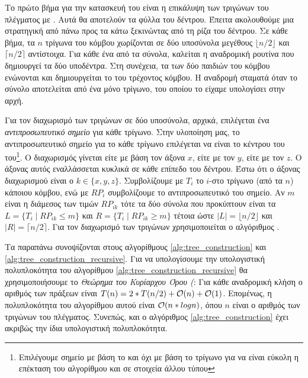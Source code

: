Το πρώτο βήμα για την κατασκευή του  είναι η επικάλυψη 
των τριγώνων του πλέγματος με .
Αυτά θα αποτελούν τα φύλλα του δέντρου.
Έπειτα ακολουθούμε μια στρατηγική από πάνω προς τα κάτω ξεκινώντας 
από τη ρίζα του δέντρου. 
Σε κάθε βήμα, τα $n$ τρίγωνα του κόμβου χωρίζονται σε δύο υποσύνολα 
μεγέθους $\lfloor n/2\rfloor$ και $\lceil n/2 \rceil$ αντίστοιχα.
Για κάθε ένα από τα σύνολα, καλείται η αναδρομική ρουτίνα που δημιουργεί 
τα δύο υποδέντρα.  
Στη συνέχεια, τα  των δύο παιδιών του κόμβου ενώνονται 
και δημιουργείται το  του τρέχοντος κόμβου.
Η αναδρομή σταματά όταν το σύνολο αποτελείται από ένα μόνο τρίγωνο, 
του οποίου το  είχαμε υπολογίσει στην αρχή.

Για τον διαχωρισμό των τριγώνων σε δύο υποσύνολα, αρχικά, επιλέγεται 
ένα \textit{αντιπροσωπευτικό σημείο} για κάθε τρίγωνο.
Στην υλοποίηση μας, το αντιπροσωπευτικό σημείο για το κάθε τρίγωνο 
επιλέγεται να είναι το κέντρου του  του\footnote{Επιλέγουμε 
σημείο με βάση το  και όχι με βάση το τρίγωνο για να είναι 
εύκολη η επέκταση του αλγορίθμου και σε στοιχεία άλλου τύπου}.
Ο διαχωρισμός γίνεται είτε με βάση τον άξονα $x$, είτε με τον $y$, είτε 
με τον $z$.
Ο άξονας αυτός εναλλάσσεται κυκλικά σε κάθε επίπεδο του δέντρου.
Έστω ότι ο άξονας διαχωρισμού είναι ο $k \in \{x,y,z\}$. 
Συμβολίζουμε με $T_i$ το $i$-στο τρίγωνο (από τα $n$)
κάποιου κόμβου, ενώ με $RP_i$ συμβολίζουμε το αντιπροσωπευτικό του 
σημείο.
Αν $m$ είναι η διάμεσος των τιμών $RP_{ik}$ τότε τα δύο σύνολα 
που προκύπτουν είναι τα $L = \{T_i \mid RP_{ik} \leq m \}$ και 
$R = \{T_i  \mid  RP_{ik} \geq m \}$ 
τέτοια ώστε 
$|L| = \lfloor n/2 \rfloor$ και $|R| = \lceil n/2 \rceil$.
Για τον διαχωρισμό των τριγώνων χρησιμοποιείται ο 
αλγόριθμος \texttt{} \cite{hoare1961algorithm}.

Τα παραπάνω συνοψίζονται στους αλγορίθμους \ref{alg:tree_construction} και 
\ref{alg:tree_construction_recursive}.
Για να υπολογίσουμε την υπολογιστική πολυπλοκότητα του αλγορίθμου 
\ref{alg:tree_construction_recursive} θα χρησιμοποιήσουμε το 
\textit{Θεώρημα του Κυρίαρχου Όρου (}:
Για κάθε αναδρομική κλήση ο αριθμός των πράξεων είναι 
$T(n) = 2*T(n/2) + \mathcal{O}(n) + \mathcal{O}(1)$.
Επομένως, η πολυπλοκότητα του αλγορίθμου αυτού είναι 
$\mathcal{O}(n*logn)$, όπου $n$ είναι ο αριθμός των τριγώνων 
του πλέγματος.
Συνεπώς, και ο αλγόριθμος \ref{alg:tree_construction} έχει 
ακριβώς την ίδια υπολογιστική πολυπλοκότητα.


